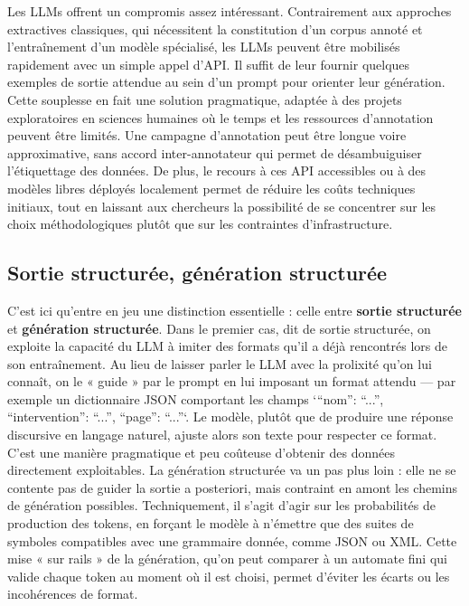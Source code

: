 Les LLMs offrent un compromis assez intéressant. Contrairement aux approches extractives classiques, qui nécessitent la constitution d’un corpus annoté et l’entraînement d’un modèle spécialisé, les LLMs peuvent être mobilisés rapidement avec un simple appel d'API. Il suffit de leur fournir quelques exemples de sortie attendue au sein d’un prompt pour orienter leur génération. Cette souplesse en fait une solution pragmatique, adaptée à des projets exploratoires en sciences humaines où le temps et les ressources d’annotation peuvent être limités. Une campagne d'annotation peut être longue voire approximative, sans accord inter-annotateur qui permet de désambuiguiser l'étiquettage des données. De plus, le recours à ces API accessibles ou à des modèles libres déployés localement permet de réduire les coûts techniques initiaux, tout en laissant aux chercheurs la possibilité de se concentrer sur les choix méthodologiques plutôt que sur les contraintes d’infrastructure. 

\subsection{Sortie structurée, génération structurée}

C’est ici qu’entre en jeu une distinction essentielle : celle entre \textbf{sortie structurée} et \textbf{génération structurée}. Dans le premier cas, dit de sortie structurée, on exploite la capacité du LLM à imiter des formats qu’il a déjà rencontrés lors de son entraînement. Au lieu de laisser parler le LLM avec la prolixité qu'on lui connaît, on le « guide » par le prompt en lui imposant un format attendu — par exemple un dictionnaire JSON comportant les champs `{\enquote{nom}: \enquote{...}, \enquote{intervention}: \enquote{...}, \enquote{page}: \enquote{...}}`. Le modèle, plutôt que de produire une réponse discursive en langage naturel, ajuste alors son texte pour respecter ce format. C’est une manière pragmatique et peu coûteuse d’obtenir des données directement exploitables. La génération structurée va un pas plus loin : elle ne se contente pas de guider la sortie a posteriori, mais contraint en amont les chemins de génération possibles. Techniquement, il s’agit d’agir sur les probabilités de production des tokens, en forçant le modèle à n’émettre que des suites de symboles compatibles avec une grammaire donnée, comme JSON ou XML. Cette mise « sur rails » de la génération, qu’on peut comparer à un automate fini qui valide chaque token au moment où il est choisi, permet d’éviter les écarts ou les incohérences de format. 

